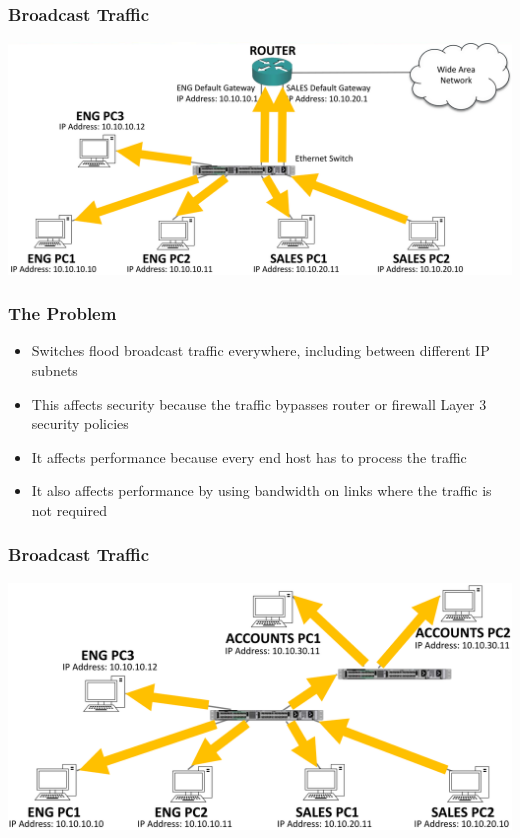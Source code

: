 \documentclass[pdflatex,compress,mathserif]{beamer}
\begin{document}
\begin{frame}
	\frametitle{Broadcast Traffic}
	\begin{center}
		\includegraphics[width=\linewidth]{img/img12}
	\end{center}
\end{frame}

\begin{frame}
	\frametitle{The Problem}
	\begin{itemize}
		\item Switches flood broadcast traffic everywhere, including between
different IP subnets
		\item This affects security because the traffic bypasses router or firewall
Layer 3 security policies
		\item It affects performance because every end host has to process the
traffic
		\item It also affects performance by using bandwidth on links where the
traffic is not required
	\end{itemize}
\end{frame}

\begin{frame}
	\frametitle{Broadcast Traffic}
	\begin{center}
		\includegraphics[width=\linewidth]{img/img13}
	\end{center}
\end{frame}
\end{document}
